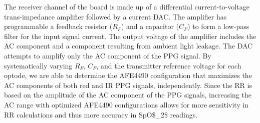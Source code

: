 The receiver channel of the board is made up of a differential current-to-voltage trans-impedance amplifier followed by a current \ac{DAC}. The amplifier has programmable a feedback resistor ($R_F$) and a capacitor ($C_F$) to form a low-pass filter for the input signal current. The output voltage of the amplifier includes the \ac{AC} component and a component resulting from ambient light leakage. The \ac{DAC} attempts to amplify only the \ac{AC} component of the \ac{PPG} signal. By systematically varying $R_F$, $C_F$, and the transmitter reference voltage for each optode, we are able to determine the \ac{AFE4490} configuration that maximizes the \ac{AC} components of both red and \ac{IR} \ac{PPG} signals, independently. Since the \ac{RR} is based on the amplitude of the \ac{AC} component of the \ac{PPG} signals, increasing the \ac{AC} range with optimized \ac{AFE4490} configurations allows for more sensitivity in \ac{RR} calculations and thus more accuracy in \ac{SpO$_2$} readings. 
        
